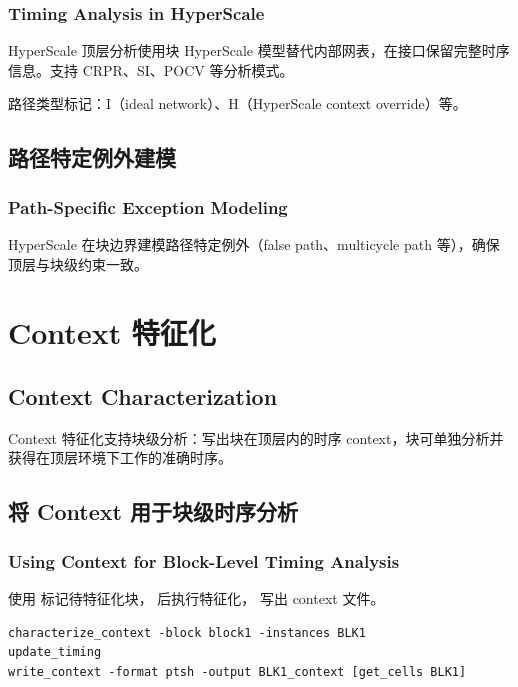 \subsubsection*{Timing Analysis in HyperScale}

HyperScale 顶层分析使用块 HyperScale 模型替代内部网表，在接口保留完整时序信息。支持 CRPR、SI、POCV 等分析模式。

路径类型标记：I（ideal network）、H（HyperScale context override）等。

\subsection{路径特定例外建模}
\subsubsection*{Path-Specific Exception Modeling}

HyperScale 在块边界建模路径特定例外（false path、multicycle path 等），确保顶层与块级约束一致。


\section{Context 特征化}
\subsection*{Context Characterization}

Context 特征化支持块级分析：写出块在顶层内的时序 context，块可单独分析并获得在顶层环境下工作的准确时序。


\subsection{将 Context 用于块级时序分析}
\subsubsection*{Using Context for Block-Level Timing Analysis}

使用  标记待特征化块， 后执行特征化， 写出 context 文件。

\begin{lstlisting}
characterize_context -block block1 -instances BLK1
update_timing
write_context -format ptsh -output BLK1_context [get_cells BLK1]
\end{lstlisting}

